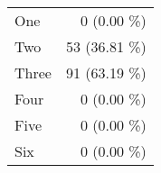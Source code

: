 \begin{tabular}{ l  r }
One & 0 (0.00 \%)\\
Two & 53 (36.81 \%)\\
Three & 91 (63.19 \%)\\
Four & 0 (0.00 \%)\\
Five & 0 (0.00 \%)\\
Six & 0 (0.00 \%)\\
\end{tabular}